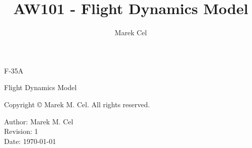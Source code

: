 \documentclass[12pt,a4paper]{article}
\title{AW101 - Flight Dynamics Model}
\author{Marek Cel}
\date{}
\begin{document}
  
  \begin{titlepage}
    \centering
    {\huge F-35A \par Flight Dynamics Model\par}
  \end{titlepage}
  

  \noindent Copyright \copyright{} \the\year{} Marek M. Cel. All rights reserved.

  \noindent Author: Marek M. Cel \\
  Revision: 1 \\
  Date: \today

  
  \clearpage
  \thispagestyle{empty}
  

  \restoregeometry

  {
    \clearpage
    \setlength{\parskip}{0em}
    \tableofcontents
  }

  
  
  
  \clearpage
   
  
  
\end{document}
